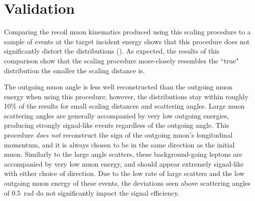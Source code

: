 \section{Validation}
\label{sec:validation}

Comparing the recoil muon kinematics produced using this scaling procedure to a sample of \mg events at the target incident energy shows that this procedure does not significantly distort the distributions ().
As expected, the results of this comparison show that the scaling procedure more-closely resembles the ``true" \mg distribution the smaller the scaling distance is.

The outgoing muon angle is less well reconstructed than the outgoing muon energy when using this procedure; however, the distributions stay within roughly 10\% of the \mg results for small scaling distances and scattering angles.
Large muon scattering angles are generally accompanied by very low outgoing energies, producing strongly signal-like events regardless of the outgoing angle. 
This procedure \emph{does not} reconstruct the sign of the outgoing muon's longitudinal momentum, and it is always chosen to be in the same direction as the initial muon. 
Similarly to the large angle scatters, these background-going leptons are accompanied by very low muon energy, and should appear extremely signal-like with either choice of direction.
Due to the low rate of large scatters and the low outgoing muon energy of these events, the deviations seen above scattering angles of \SI{0.5}{\radian} do not significantly impact the signal efficiency.


